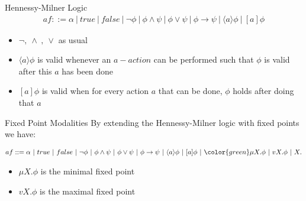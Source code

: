 \documentclass[aspectratio=1610]{beamer}
\begin{document}
  \begin{frame}{Hennessy-Milner Logic}
    \begin{align*}
      af ::= \alpha\ |\ true\ |\ false\ |\ \neg \phi\ |\ \phi \land \psi\ |\ \phi \lor \psi\ |\ \phi \to \psi\ |\ \langle a \rangle \phi \ |\ [a]\phi
    \end{align*}
    \begin{itemize}
      \item $\neg ,\ \land\ ,\ \lor$ as usual
      \item $\langle a \rangle \phi$ is valid whenever an $a-action$ can be performed such that $\phi$ is valid after this $a$ has been done
      \item $[a]\phi$ is valid when for every action $a$ that can be done, $\phi$ holds after doing that $a$
    \end{itemize}
  \end{frame}

  \begin{frame}{Fixed Point Modalities}
    By extending the Hennessy-Milner logic with fixed points we have:
    \resizebox{ \textwidth}{!} {
      \begin{minipage}{\textwidth}
        \begin{align*}
          af ::= \alpha\ |\ true\ |\ false\ |\ \neg \phi\ |\ \phi \land \psi\ |\ \phi \lor \psi\ |\ \phi \to \psi\ |\ \langle a \rangle \phi \ |\ [a]\phi\ |\ \color{green} \mu X. \phi \ |\ vX. \phi \ |\ X.
        \end{align*}
      \end{minipage}
    }
    \begin{itemize}
      \item $\mu X. \phi$ is the minimal fixed point
      \item $vX. \phi$ is the maximal fixed point
    \end{itemize}
  \end{frame}
\end{document}
